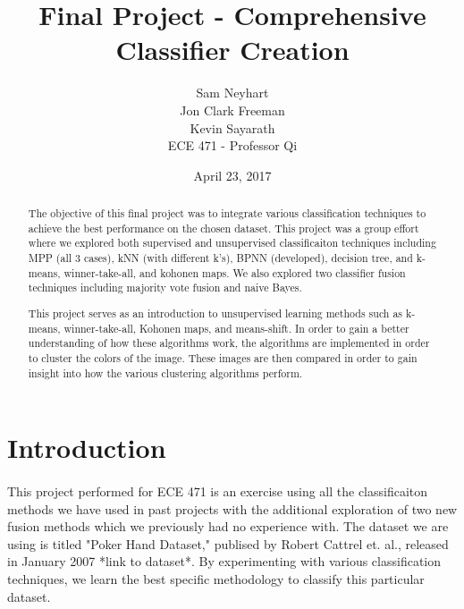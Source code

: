 \documentclass{article}
\begin{document}
\title{Final Project - Comprehensive Classifier Creation}
\author{Sam Neyhart\\ Jon Clark Freeman\\ Kevin Sayarath\\ ECE 471 - Professor Qi}
\date{April 23, 2017}
\maketitle
\newpage

\begin{abstract}
The objective of this final project was to integrate various classification
techniques to achieve the best performance on the chosen dataset. This project
was a group effort where we explored both supervised and unsupervised
classificaiton techniques including MPP (all 3 cases), kNN (with different k's),
BPNN (developed), decision tree, and k-means, winner-take-all, and kohonen maps.
We also explored two classifier fusion techniques including majority vote fusion
and naive Bayes.
\end{abstract}
\newpage


\begin{abstract}
This project serves as an introduction to unsupervised learning methods 
such as k-means, winner-take-all, Kohonen maps, and means-shift. In order
to gain a better understanding of how these algorithms work, the algorithms
are implemented in order to cluster the colors of the image. These images
are then compared in order to gain insight into how the various clustering
algorithms perform.
\end{abstract}
\newpage


\section*{Introduction}
\paragraph{}
This project performed for ECE 471 is an exercise using all the classificaiton methods
we have used in past projects with the additional exploration of two new fusion methods
which we previously had no experience with.  The dataset we are using is titled "Poker
Hand Dataset," publised by Robert Cattrel et. al., released in January 2007 *link to
dataset*.  By experimenting with various classification techniques, we learn the best
specific methodology to classify this particular dataset.
\end{document}
